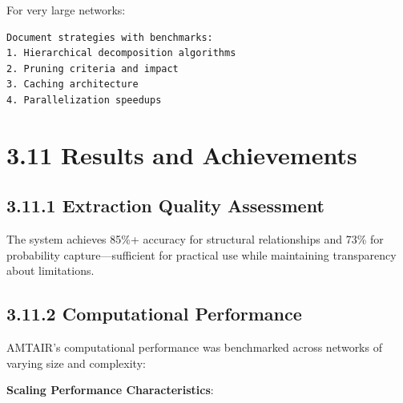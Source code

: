 \documentclass[
  11pt,
  letterpaper,
]{book}
\begin{document}
For very large networks:

\begin{verbatim}
Document strategies with benchmarks:
1. Hierarchical decomposition algorithms
2. Pruning criteria and impact
3. Caching architecture
4. Parallelization speedups
\end{verbatim}

\section*{3.11 Results and Achievements}\label{sec-results-achievements}


\subsection*{3.11.1 Extraction Quality
Assessment}\label{sec-extraction-quality}

\begin{tcolorbox}[enhanced jigsaw, opacityback=0, leftrule=.75mm, breakable, coltitle=black, colbacktitle=quarto-callout-tip-color!10!white, bottomrule=.15mm, rightrule=.15mm, toprule=.15mm, left=2mm, bottomtitle=1mm, arc=.35mm, toptitle=1mm, titlerule=0mm, title=\textcolor{quarto-callout-tip-color}{\faLightbulb}\hspace{0.5em}{Performance Highlights}, opacitybacktitle=0.6, colframe=quarto-callout-tip-color-frame, colback=white]

The system achieves 85\%+ accuracy for structural relationships and 73\%
for probability capture---sufficient for practical use while maintaining
transparency about limitations.

\end{tcolorbox}

\subsection*{3.11.2 Computational
Performance}\label{sec-computational-performance}

AMTAIR's computational performance was benchmarked across networks of
varying size and complexity:

\textbf{Scaling Performance Characteristics}:
\end{document}
